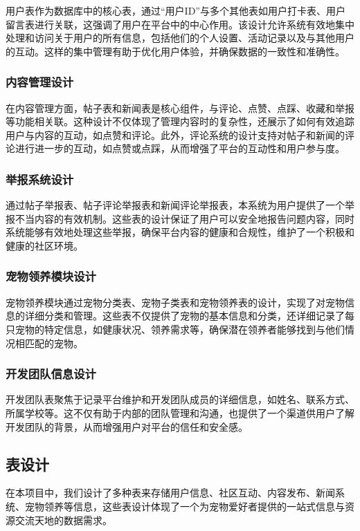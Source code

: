 用户表作为数据库中的核心表，通过“用户ID”与多个其他表如用户打卡表、用户留言表进行关联，这强调了用户在平台中的中心作用。该设计允许系统有效地集中处理和访问关于用户的所有信息，包括他们的个人设置、活动记录以及与其他用户的互动。这样的集中管理有助于优化用户体验，并确保数据的一致性和准确性。

\subsubsection{内容管理设计}

在内容管理方面，帖子表和新闻表是核心组件，与评论、点赞、点踩、收藏和举报等功能相关联。这种设计不仅体现了管理内容时的复杂性，还展示了如何有效追踪用户与内容的互动，如点赞和评论。此外，评论系统的设计支持对帖子和新闻的评论进行进一步的互动，如点赞或点踩，从而增强了平台的互动性和用户参与度。

\subsubsection{举报系统设计}

通过帖子举报表、帖子评论举报表和新闻评论举报表，本系统为用户提供了一个举报不当内容的有效机制。这些表的设计保证了用户可以安全地报告问题内容，同时系统能够有效地处理这些举报，确保平台内容的健康和合规性，维护了一个积极和健康的社区环境。

\subsubsection{宠物领养模块设计}

宠物领养模块通过宠物分类表、宠物子类表和宠物领养表的设计，实现了对宠物信息的详细分类和管理。这些表不仅提供了宠物的基本信息和分类，还详细记录了每只宠物的特定信息，如健康状况、领养需求等，确保潜在领养者能够找到与他们情况相匹配的宠物。

\subsubsection{开发团队信息设计}

开发团队表聚焦于记录平台维护和开发团队成员的详细信息，如姓名、联系方式、所属学校等。这不仅有助于内部的团队管理和沟通，也提供了一个渠道供用户了解开发团队的背景，从而增强用户对平台的信任和安全感。

\subsection{表设计}

在本项目中，我们设计了多种表来存储用户信息、社区互动、内容发布、新闻系统、宠物领养等信息，这些表设计体现了一个为宠物爱好者提供的一站式信息与资源交流天地的数据需求。

